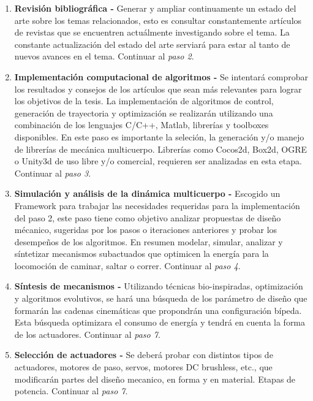 \documentclass[12pt,twoside,onecolumn,letterpaper]{article}
\begin{document}
\begin{enumerate}
\item \textbf{Revisi\'on bibliogr\'afica -} Generar y ampliar continuamente un estado del arte sobre los temas relacionados, esto es consultar constantemente art\'iculos de revistas que se encuentren actu\'almente investigando sobre el tema. La constante actualizaci\'on del estado del arte serviar\'a para estar al tanto de nuevos avances en el tema. Continuar al \emph{paso 2}.\par
\item \textbf{Implementaci\'on computacional de algoritmos -} Se intentar\'a comprobar los resultados y consejos de los art\'iculos que sean m\'as relevantes para lograr los objetivos de la tesis. La implementaci\'on de algoritmos de control, generaci\'on de trayectoria y optimizaci\'on se realizar\'an utilizando una combinaci\'on de los lenguajes C/C++, Matlab, librer\'ias y toolboxes disponibles. En este paso es importante la seleci\'on, la generaci\'on y/o manejo de librer\'ias de mec\'anica multicuerpo. Librer\'ias como Cocos2d, Box2d, OGRE o Unity3d de uso libre y/o comercial, requieren ser analizadas en esta etapa. Continuar al \emph{paso 3}.\par
\item \textbf{Simulaci\'on y an\'alisis de la din\'amica multicuerpo - } Escogido un Framework para trabajar las necesidades requeridas para la implementaci\'on del paso 2, este paso tiene como objetivo analizar propuestas de dise\~no m\'ecanico, sugeridas por los pasos o iteraciones anteriores y probar los desempe\~nos de los algoritmos. En resumen modelar, simular, analizar y s\'intetizar mecanismos subactuados que optimicen la energ\'ia para la locomoci\'on de caminar, saltar o correr. Continuar al \emph{paso 4}.\par
\item \textbf{S\'intesis de mecanismos - } Utilizando t\'ecnicas bio-inspiradas, optimizaci\'on y algoritmos evolutivos, se har\'a una b\'usqueda de los parámetro de dise\~no que formar\'an las cadenas cinem\'aticas que propondrán una configuraci\'on b\'ipeda. Esta búsqueda optimizara el consumo de energ\'ia y tendrá en cuenta la forma de los actuadores. Continuar al \emph{paso 7}.\par
\item \textbf{Selecci\'on de actuadores - } Se deber\'a probar con distintos tipos de actuadores, motores de paso, servos, motores DC brushless, etc., que modificar\'an partes del dise\~no mecanico, en forma y en material. Etapas de potencia. Continuar al \emph{paso 7}.\par

\end{enumerate}
\end{document}
